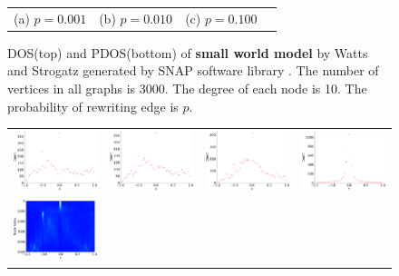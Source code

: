 \documentclass[senior,final,11pt]{iscs-thesis}
\begin{document}
\begin{figure}[htbp]
\begin{tabular}{cccc}
    (a) $p=0.001$ & (b) $p=0.010$ & (c) $p=0.100$ \\ [6pt]
  \end{tabular}
  \caption{DOS(top) and PDOS(bottom) of {\bf small world model} by Watts and Strogatz \cite{watts1998collective} generated by SNAP software library \cite{leskovec2016snap}. The number of vertices in all graphs is 3000. The degree of each node is 10. The probability of rewriting edge is $p$.}
  \label{fig:small_world}
\end{figure}




\begin{figure}[htbp]
  \setlength\tabcolsep{0pt}
  \hspace{-3.0cm}
  \begin{tabular}{cccc}
    \includegraphics[width=45mm]{figure/forest_fire_5000_030_030txt_dos.png} &
    \includegraphics[width=45mm]{figure/forest_fire_5000_035_030txt_dos.png} &
    \includegraphics[width=45mm]{figure/forest_fire_5000_040_030txt_dos.png} &
    \includegraphics[width=45mm]{figure/forest_fire_5000_045_030txt_dos.png} \\
    \includegraphics[width=45mm]{figure/forest_fire_5000_030_030txt_pdos.png} &

\end{tabular}
\end{figure}
\end{document}
